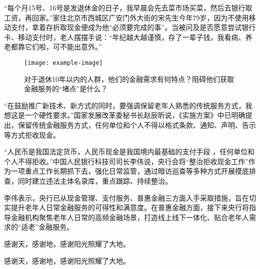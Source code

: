 \documentclass[printMode]{ecnuthesis}
\begin{document}
“每个月15号、16号是发退休金的日子，我早晨会先去菜市场买菜，然后去银行取工资，再回家。”家住北京市西城区广安门外大街的宋先生今年79岁，因为不使用移动支付，拿着存折取现金便成为他“必须要完成的事”。当被问及是否愿意尝试银行卡、移动支付时，老人摆摆手说：“年纪越大越谨慎，存了一辈子钱，我看病、养老都靠它们啦，可不能出意外。”

\begin{figure}
    \centering
    \texttt{[image: example-image]}
    \caption{对于退休10年以内的人群，他们的金融需求有何特点？阻碍他们获取金融服务的“堵点”是什么？}
  \end{figure}

“在鼓励推广新技术、新方式的同时，要强调保留老年人熟悉的传统服务方式，我想这是一个硬性要求。”国家发展改革委秘书长赵辰昕说，《实施方案》中已明确提出，保留传统金融服务方式，任何单位和个人不得以格式条款、通知、声明、告示等方式拒收现金。

“人民币是我国法定货币，人民币现金是我国境内最基础的支付手段 \cite{Yang_Hy200215} ，任何单位和个人不得拒收。”中国人民银行科技司司长李伟说，央行会将“整治拒收现金工作”作为一项重点工作长期抓下去，强化日常监管，通过暗访巡查等多种方式开展摸底排查，同时建立违法主体名录库，重点跟踪、持续整治。

李伟表示，央行已从现金管理、支付服务、普惠金融三方面入手采取措施，旨在切实提升老年人日常金融服务的可得性和满意度。在普惠金融方面，接下来央行将指导金融机构聚焦老年人日常的高频金融场景，打造线上线下一体化、贴合老年人需求的“适老”金融服务。

\backmatter
\PrintReference

\begin{appendix}
  感谢天，感谢地，感谢阳光照耀了大地。
\end{appendix}

\begin{acknowledgement}
  感谢天，感谢地，感谢阳光照耀了大地。
\end{acknowledgement}
\end{document}
